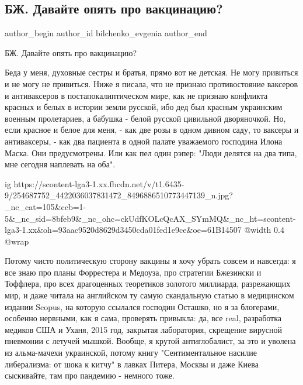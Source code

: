  
 
 
 
 
 
\subsection{БЖ. Давайте опять про вакцинацию?}
\label{sec:09_11_2021.fb.bilchenko_evgenia.1.vaccinacia}
 
\ifcmt
 author_begin
   author_id bilchenko_evgenia
 author_end
\fi

БЖ. Давайте опять про вакцинацию? 

Беда у меня, духовные сестры и братья, прямо вот не детская. Не могу привиться
и не могу не привиться. Ниже я писала, что не признаю противостояние ваксеров и
антиваксеров в постапокалиптическом мире, как не признаю конфликта красных и
белых в истории земли русской, ибо дед был красным украинским военным
пролетариев, а бабушка - белой русской цивильной дворяночкой. Но, если красное
и белое для меня, - как две розы в одном дивном саду, то ваксеры и антиваксеры,
- как два пациента в одной палате уважаемого господина Илона Маска. Они
предусмотрены. Или как пел один рэпер: "Люди делятся на два типа, мне сегодня
наплевать на оба".

\ifcmt
  ig https://scontent-lga3-1.xx.fbcdn.net/v/t1.6435-9/254687752_4422036037831472_8496886510773447139_n.jpg?_nc_cat=105&ccb=1-5&_nc_sid=8bfeb9&_nc_ohc=ckUdfKOLcQcAX_SYmMQ&_nc_ht=scontent-lga3-1.xx&oh=93aac9520d8629d3450cda01fed1e9ce&oe=61B14507
  @width 0.4
  @wrap 
\fi

Потому чисто политическую сторону вакцины я хочу убрать совсем и навсегда: я
все знаю про планы Форрестера и Медоуза, про стратегии Бжезински и Тоффлера,
про всех драгоценных теоретиков золотого миллиарда, разрежающих мир, и даже
читала на английском ту самую скандальную статью в медицинском издании Scopus,
на которую ссылался господин Осташко, но я за блогерами, особенно нервными, как
я сама, проверять привыкла: да, все real, разработка медиков США и Уханя, 2015
год, закрытая лаборатория, скрещение вирусной пневмонии с летучей мышкой.
Вообще, я крутой антиглобалист, за это и уволена из альма-мачехи украинской,
потому книгу "Сентиментальное насилие либерализма: от шока к китчу" в лавках
Питера, Москвы и даже Киева сыскивайте, там про пандемию - немного тоже. 

